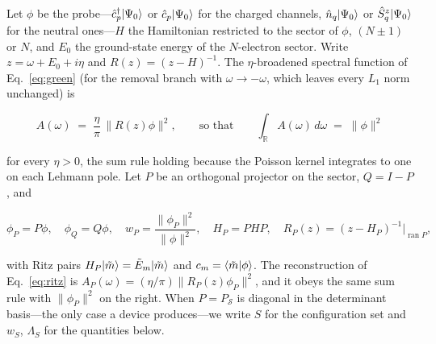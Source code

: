 Let $\phi$ be the probe---$\hat c^{\dagger}_p\lvert \Psi_0 \rangle$ or
$\hat c_p\lvert \Psi_0 \rangle$ for the charged channels, $\hat n_q\lvert \Psi_0 \rangle$ or $\hat S^{z}_q\lvert \Psi_0 \rangle$
for the neutral ones---$H$ the Hamiltonian restricted to the sector of $\phi$, $(N{\pm}1)$ or $N$, and
$E_0$ the ground-state energy of the $N$-electron sector. Write $z=\omega+E_0+i\eta$ and $R(z)=(z-H)^{-1}$. The $\eta$-broadened spectral
function of Eq.~\eqref{eq:green} (for the removal branch with $\omega\to-\omega$, which leaves every
$L_1$ norm unchanged) is
\begin{widetext}
\begin{equation}
A(\omega)\;=\;\frac{\eta}{\pi}\,\bigl\lVert R(z)\phi\bigr\rVert^{2},
\qquad\text{so that}\qquad
\int_{\mathbb R}A(\omega)\,d\omega\;=\;\lVert\phi\rVert^{2}
\label{eq:lehmannA}
\end{equation}
\end{widetext}
for every $\eta>0$, the sum rule holding because the Poisson kernel integrates to one on each Lehmann
pole. Let $P$ be an orthogonal projector on the sector, $Q=I-P$, and
\begin{widetext}
\begin{equation}
\phi_P=P\phi,\quad \phi_Q=Q\phi,\quad
w_P=\frac{\lVert\phi_P\rVert^{2}}{\lVert\phi\rVert^{2}},\quad
H_P=PHP,\quad R_P(z)=(z-H_P)^{-1}\big|_{\operatorname{ran}P},
\label{eq:ritz3}
\end{equation}
\end{widetext}
with Ritz pairs $H_P\lvert \tilde m \rangle=\tilde E_m\lvert \tilde m \rangle$ and $c_m=\langle \tilde m|\phi \rangle$. The
reconstruction of Eq.~\eqref{eq:ritz} is $A_P(\omega)=(\eta/\pi)\lVert R_P(z)\phi_P\rVert^{2}$, and it
obeys the same sum rule with $\lVert\phi_P\rVert^{2}$ on the right. When $P=P_{\mathcal S}$ is diagonal
in the determinant basis---the only case a device produces---we write $S$ for the configuration set
and $w_S$, $\Lambda_S$ for the quantities below.

